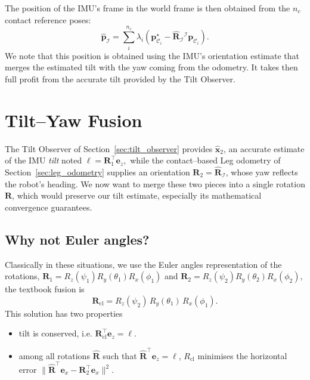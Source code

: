 \documentclass{IJCAS}
\begin{document}
The position of the IMU's frame in the world frame is then obtained from the $n_{c}$ contact reference poses: 
\begin{equation}
    \hat{\boldsymbol{p}}_{\mathcal{I}} = \sum^{n_{c}}_{i} \lambda_{i} \left( \boldsymbol{p}^{\star}_{{\mathcal{C}}_{i}} - \hat{\boldsymbol{R}}_{\mathcal{I}} {}^{\mathcal{I}}\boldsymbol{p}_{{\mathcal{C}}_{i}} \right).
\end{equation}
We note that this position is obtained using the IMU's orientation estimate that merges the estimated tilt with the yaw coming from the odometry. It takes then full profit from the accurate tilt provided by the Tilt Observer.


\section{Tilt--Yaw Fusion}
\label{sec:axisAgnostic}

The Tilt Observer of Section~\ref{sec:tilt_observer} provides $\hat{\boldsymbol{x}}_{2}$,  an accurate
estimate of the IMU \emph{tilt} noted
\(
  \boldsymbol{\ell}=\boldsymbol{R}_{1}^{\top}\boldsymbol{e}_{z},
\)
while the contact–based Leg odometry of
Section~\ref{sec:leg_odometry} supplies an orientation \(\boldsymbol{R}_{2} = \hat{\boldsymbol{R}}_{\mathcal{I}}\), whose
yaw reflects the robot's heading.  We now want to merge these two pieces into a
single rotation \(\boldsymbol{R}\), which would preserve our tilt estimate, especially its mathematical convergence guarantees.

\subsection{Why not Euler angles?}

Classically in these situations, we use the Euler angles representation of the rotations,
\(\boldsymbol{R}_{1}=R_{z}(\psi_{1})R_{y}(\theta_{1})R_{x}(\phi_{1})\) and
\(\boldsymbol{R}_{2}=R_{z}(\psi_{2})R_{y}(\theta_{2})R_{x}(\phi_{2})\),
the textbook fusion is
\begin{equation}
  \boldsymbol{R}_{\mathrm{cl}}
  =R_{z}(\psi_{2})\,R_{y}(\theta_{1})\,R_{x}(\phi_{1}).
  \label{eq:fusion_classic}
\end{equation}
This solution has two properties
\begin{itemize}
\item tilt is conserved, i.e. 
\(\boldsymbol{R}_{\mathrm{cl}}^{\top}\boldsymbol{e}_{z}=\boldsymbol{\ell}\).
\item among all rotations \(\hat{\boldsymbol{R}}\) such that
\(\hat{\boldsymbol{R}}^{\top}\boldsymbol{e}_{z}=\boldsymbol{\ell}\),
\(R_{\mathrm{cl}}\) minimises the horizontal error
\(
  \|
    \hat{\boldsymbol{R}}^{\top}\boldsymbol{e}_{x}-\boldsymbol{R}_{2}^{\top}\boldsymbol{e}_{x}
  \|^{2}.
\)
\end{itemize}
\end{document}
